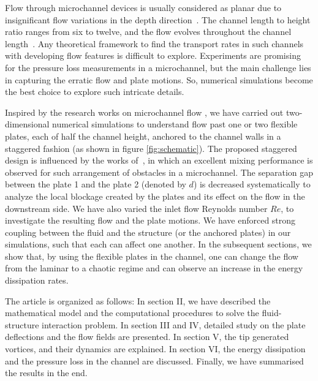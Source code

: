 \documentclass[aps,pre,twocolumn,aps,longbibliography]{revtex4-1}
\begin{document}
	Flow through microchannel devices is usually considered as planar due to insignificant flow variations in the depth direction~\cite{Khatvakar2007, LambertRangel2010, Stone2001}. The channel length to height ratio ranges from six to twelve, and the flow evolves throughout the channel length~\cite{Beebe2010, Whitesides2006, Liu2010}. Any theoretical framework to find the transport rates in such channels with developing flow features is difficult to explore. Experiments are promising for the pressure loss measurements in a microchannel, but the main challenge lies in capturing the erratic flow and plate motions. So, numerical simulations become the best choice to explore such intricate details.
	
	Inspired by the research works on microchannel flow \cite{Khatvakar2007, LambertRangel2010, Gleeson2005, Pathak2012, Kim2010, Stone2001, Stone2004}, we have carried out two-dimensional numerical simulations to understand flow past one or two flexible plates, each of half the channel height, anchored to the channel walls in a staggered fashion (as shown in figure \ref{fig:schematic}). The proposed staggered design is influenced by the works of~\cite{Asgar2007}, in which an excellent mixing performance is observed for such arrangement of obstacles in a microchannel. The separation gap between the plate 1 and the plate 2 (denoted by $d$) is decreased systematically to analyze the local blockage created by the plates and its effect on the flow in the downstream side. We have also varied the inlet flow Reynolds number $Re$, to investigate the resulting flow and the plate motions. We have enforced strong coupling between the fluid and the structure (or the anchored plates) in our simulations, such that each can affect one another. In the subsequent sections, we show that, by using the flexible plates in the channel, one can change the flow from the laminar to a chaotic regime and can observe an increase in the energy dissipation rates.
	
	
	
	The article is organized as follows: In section II, we have described the mathematical model and the computational procedures to solve the fluid-structure interaction problem. In section III and IV, detailed study on the plate deflections and the flow fields are presented. In section V, the tip generated vortices, and their dynamics are explained. In section VI, the energy dissipation and the pressure loss in the channel are discussed. Finally, we have summarised the results in the end.
	
\end{document}
